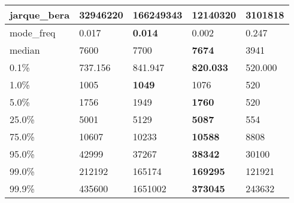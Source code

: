 \begin{table}[H]
\begin{tabular}{|l|m{10em}|m{10em}|m{10em}|m{10em}|}
\hline jarque\_bera & 32946220 & \cellcolor[rgb]{0.9, 0.54, 0.52} 166249343 & \bfseries 12140320 & 3101818 \\
\hline mode\_freq & 0.017 & \bfseries 0.014 & 0.002 & \cellcolor[rgb]{0.9, 0.54, 0.52} 0.247 \\
\hline median & 7600 & 7700 & \bfseries 7674 & \cellcolor[rgb]{0.9, 0.54, 0.52} 3941 \\
\hline 0.1\% & 737.156 & 841.947 & \bfseries 820.033 & \cellcolor[rgb]{0.9, 0.54, 0.52} 520.000 \\
\hline 1.0\% & 1005 & \bfseries 1049 & 1076 & \cellcolor[rgb]{0.9, 0.54, 0.52} 520 \\
\hline 5.0\% & 1756 & 1949 & \bfseries 1760 & \cellcolor[rgb]{0.9, 0.54, 0.52} 520 \\
\hline 25.0\% & 5001 & 5129 & \bfseries 5087 & \cellcolor[rgb]{0.9, 0.54, 0.52} 554 \\
\hline 75.0\% & 10607 & 10233 & \bfseries 10588 & \cellcolor[rgb]{0.9, 0.54, 0.52} 8808 \\
\hline 95.0\% & 42999 & 37267 & \bfseries 38342 & \cellcolor[rgb]{0.9, 0.54, 0.52} 30100 \\
\hline 99.0\% & 212192 & 165174 & \bfseries 169295 & \cellcolor[rgb]{0.9, 0.54, 0.52} 121921 \\
\hline 99.9\% & 435600 & \cellcolor[rgb]{0.9, 0.54, 0.52} 1651002 & \bfseries 373045 & 243632 \\
\hline
\end{tabular}
\end{table}
